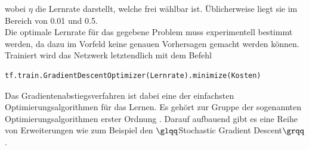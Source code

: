 wobei $\eta$ die Lernrate darstellt, welche frei w\"ahlbar ist. \"Ublicherweise liegt sie im Bereich von 0.01 und 0.5.\\
Die optimale Lernrate f\"ur das gegebene Problem muss experimentell bestimmt werden, da dazu im Vorfeld keine genauen Vorhersagen gemacht werden können.
Trainiert wird das Netzwerk letztendlich mit dem Befehl \cite{building}

\vspace{0.3cm}
\begin{lstlisting}
tf.train.GradientDescentOptimizer(Lernrate).minimize(Kosten)
\end{lstlisting}

Das Gradientenabstiegsverfahren ist dabei eine der einfachsten Optimierungsalgorithmen für das Lernen. Es gehört zur Gruppe der sogenannten Optimierungsalgorithmen erster Ordnung \cite{Goodfellow}. Darauf aufbauend gibt es eine Reihe von Erweiterungen wie zum Beispiel den $\glqq$Stochastic Gradient Descent$\grqq$ \cite{Goodfellow}.